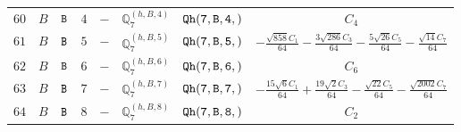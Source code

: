 \documentclass[fleqn,8pt]{jsarticle}
\begin{document}
\begin{table}[ht!]
\begin{center}
\begin{tabular}{cccccccc}
$ 60 $ & $ B $ & $ {\tt B} $ & $ 4 $ & $ - $ & $ \mathbb{Q}_{7}^{(h,B,4)} $ & $ {\tt Qh(7,B,4,)} $ & $ C_{4} $ \\
$ 61 $ & $ B $ & $ {\tt B} $ & $ 5 $ & $ - $ & $ \mathbb{Q}_{7}^{(h,B,5)} $ & $ {\tt Qh(7,B,5,)} $ & $ - \frac{\sqrt{858} C_{1}}{64} - \frac{3 \sqrt{286} C_{3}}{64} - \frac{5 \sqrt{26} C_{5}}{64} - \frac{\sqrt{14} C_{7}}{64} $ \\
$ 62 $ & $ B $ & $ {\tt B} $ & $ 6 $ & $ - $ & $ \mathbb{Q}_{7}^{(h,B,6)} $ & $ {\tt Qh(7,B,6,)} $ & $ C_{6} $ \\
$ 63 $ & $ B $ & $ {\tt B} $ & $ 7 $ & $ - $ & $ \mathbb{Q}_{7}^{(h,B,7)} $ & $ {\tt Qh(7,B,7,)} $ & $ - \frac{15 \sqrt{6} C_{1}}{64} + \frac{19 \sqrt{2} C_{3}}{64} - \frac{\sqrt{22} C_{5}}{64} - \frac{\sqrt{2002} C_{7}}{64} $ \\
$ 64 $ & $ B $ & $ {\tt B} $ & $ 8 $ & $ - $ & $ \mathbb{Q}_{7}^{(h,B,8)} $ & $ {\tt Qh(7,B,8,)} $ & $ C_{2} $ \\
 \hline \hline
\end{tabular}
\end{center}
\end{table}
\end{document}
